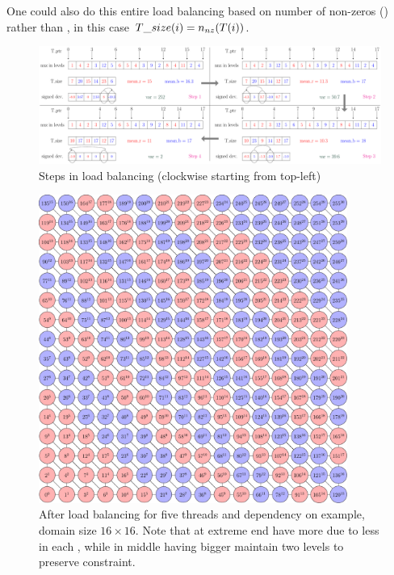   One could also do this entire load balancing based on number of non-zeros (\nnz) rather than \nrows, in this case $T\_size(i)=n_{nz}(T(i))$.
  
   \begin{figure}[tbhp]
   	\centering
   	\includegraphics[height=0.22\textheight,width=\textwidth]{pics/load_balancing/lb_alg/lb_all}
   	\caption{Steps in load balancing (clockwise starting from top-left)}
   	\label{fig:lb_alg}
   \end{figure}
   
    
    \begin{figure}
      \begin{minipage}[c]{0.63\textwidth}
      	\includegraphics[height=0.26\textheight,width=0.9\textwidth]{pics/load_balancing/2d-7pt/stencil_2d_7pt}
      \end{minipage}\hfill
      \begin{minipage}[c]{0.34\textwidth}
      	\caption{After load balancing for five threads and \DTWO dependency on \STEX example, domain size $16 \times 16$. Note that \levelGroups at extreme end have more \levels due to less \nrows in each \level, while \levelGroups in middle having bigger \levels maintain two levels to preserve \DTWO constraint.
      	} \label{fig:2d_7pt_lb}
      \end{minipage}
     \end{figure}
     

